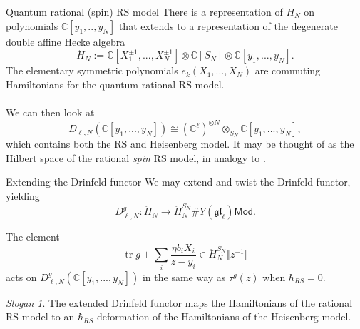 \documentclass[11pt]{beamer}
\theoremstyle{remark}
\theoremstyle{remark}
\newtheorem*{slogan}{Slogan}
\newcommand{\C}{\mathbb{C}}
\begin{document}
\begin{frame}{Quantum rational (spin) RS model}
There is a representation of $\dot H_N$ on polynomials $\C[y_1,..,y_N]$ that extends to a representation of the degenerate double affine Hecke algebra
\begin{equation*}
\ddot H_N := \C[X_1^{\pm 1},...,X_N^{\pm 1}] \otimes \C[S_N] \otimes \C[y_1,...,y_N].
\end{equation*}
The elementary symmetric polynomials $e_k(X_1,...,X_N)$ are commuting Hamiltonians for the quantum rational RS model.
\\~\\
We can then look at
\begin{equation*}
D_{\ell,N}(\C[y_1,...,y_N]) \cong (\C^\ell)^{\otimes N} \otimes_{S_N} \C[y_1,...,y_N],
\end{equation*}
which contains both the RS and Heisenberg model. It may be thought of as the Hilbert space of the rational \emph{spin} RS model, in analogy to \cite{article:lamers:2022}.
\end{frame}

\begin{frame}{Extending the Drinfeld functor}
We may extend and twist the Drinfeld functor, yielding
\begin{equation*}
D_{\ell,N}^g: \ddot H_N \to \ddot H_N^{S_N} \# Y(\mathfrak{gl}_\ell)\mathsf{Mod}.
\end{equation*}

\begin{theorem}
The element
\begin{equation*}
\operatorname{tr} g + \sum_i \frac{\eta b_i X_i}{z-y_i} \in \ddot H_N^{S_N}\llbracket z^{-1} \rrbracket
\end{equation*}
acts on $D_{\ell,N}^g(\C[y_1,...,y_N])$ in the same way as $\tau^g(z)$ when $\hbar_{RS} = 0$.
\end{theorem}

\begin{slogan}
The extended Drinfeld functor maps the Hamiltonians of the rational RS model to an $\hbar_{RS}$-deformation of the Hamiltonians of the Heisenberg model.
\end{slogan}
\end{frame}
\end{document}
